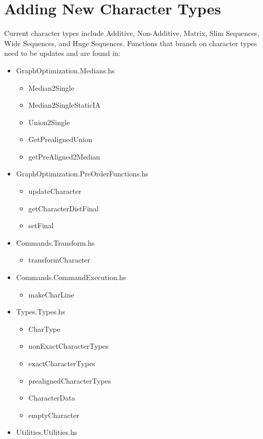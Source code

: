 \documentclass[11pt]{article}
\begin{document}
	\section{Adding New Character Types}
		Current character types include Additive, Non-Additive, Matrix, Slim Sequences, Wide Sequences, and Huge Sequences.  
		Functions that branch on character types need to be updates and are found in:
		\begin{itemize}
			 \item{GraphOptimization.Medians.hs}
			 	\begin{itemize}
			 		\item{Median2Single}
					\item{Median2SingleStaticIA}
					\item{Union2Single}
					\item{GetPrealignedUnion}
					\item{getPreAligned2Median}
			 	\end{itemize}
			 \item{GraphOptimization.PreOrderFunctions.hs}
			 	\begin{itemize}
			 		\item{updateCharacter}
			 		\item{getCharacterDistFinal}
			 		\item{setFinal}
			 	\end{itemize}
			 \item{Commands.Transform.hs}
				\begin{itemize}
				\item{transformCharacter}
			\end{itemize}
			 \item{Commands.CommandExecution.hs}
				\begin{itemize}
				\item{makeCharLine}
				\end{itemize}
			 \item{Types.Types.hs}
				 \begin{itemize}
				 	\item{CharType}
				 	\item{nonExactCharacterTypes}
				 	\item{exactCharacterTypes}
				 	\item{prealignedCharacterTypes}
				 	\item{CharacterData}
				 	\item{emptyCharacter}
				 \end{itemize}
			 \item{Utilities.Utilities.hs}

\end{itemize}
\end{document}
